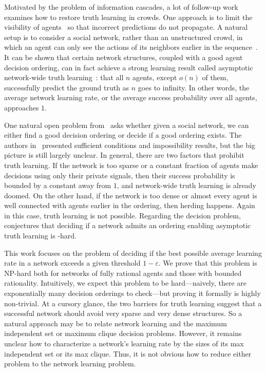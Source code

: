 Motivated by the problem of information cascades, a lot of follow-up work examines how to restore truth learning in crowds.
One approach is to limit the visibility of agents~\cite{Smith1991-sy,Sgroi2002-rz,Acemoglu2011-vj} so that incorrect predictions do not propagate. A natural setup is to consider a social network, rather than an unstructured crowd, in which an agent can only see the actions of its neighbors earlier in the sequence~\cite{Bahar2020-am,arieli2020social,lu24enabling}.
It can be shown that certain network structures, coupled with a good agent decision ordering, can in fact achieve a strong learning result called asymptotic network-wide truth learning~\cite{lu24enabling}: that all $n$ agents, except $o(n)$ of them, successfully predict the ground truth as $n$ goes to infinity. In other words, the average network learning rate, or the average success probability over all agents, approaches $1$. 

One natural open problem from~\cite{lu24enabling} asks whether given a social network, we can either find a good decision ordering or decide if a good ordering exists. The authors in~\cite{lu24enabling} presented sufficient conditions and impossibility results, but the big picture is still largely unclear. In general, there are two factors that prohibit truth learning. If the network is too sparse or a constant fraction of agents make  decisions using only their private signals, then their success probability is bounded by a constant away from $1$, and network-wide truth learning is already doomed. On the other hand, if the network is too dense or almost every agent is well connected with agents earlier in the ordering, then herding happens. Again in this case, truth learning is not possible. Regarding the decision problem, ~\cite{lu24enabling} conjectures that deciding if a network admits an ordering enabling asymptotic truth learning is \np-hard. 

 This work focuses on the problem of deciding if the best possible average learning rate in a network exceeds a given threshold $1-\varepsilon$. We prove that this problem is NP-hard both for networks of fully rational agents and those with bounded rationality. Intuitively, we expect this problem to be hard---naively, there are exponentially many decision orderings to check---but proving it formally is highly non-trivial. At a cursory glance, the two barriers for truth learning suggest that a successful network should avoid very sparse and very dense structures. So a natural approach may be to relate network learning and the maximum independent set or maximum clique decision problems. However, it remains unclear how to characterize a network's learning rate by the sizes of its max independent set or its max clique. Thus, it is not obvious how to reduce either problem to the network learning problem. 

